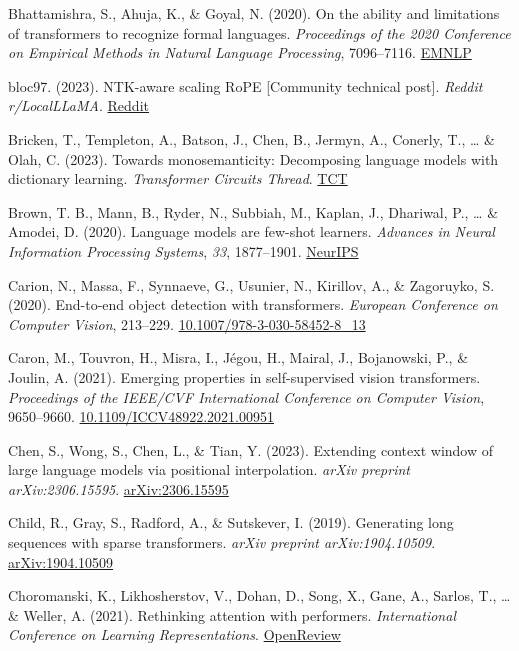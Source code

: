 \documentclass[10pt,twocolumn]{article}
\begin{document}
Bhattamishra, S., Ahuja, K., \& Goyal, N. (2020). On the ability and limitations of transformers to recognize formal languages. \emph{Proceedings of the 2020 Conference on Empirical Methods in Natural Language Processing}, 7096--7116. \href{https://aclanthology.org/2020.emnlp-main.576}{EMNLP}

bloc97. (2023). NTK-aware scaling RoPE [Community technical post]. \emph{Reddit r/LocalLLaMA}. \href{https://www.reddit.com/r/LocalLLaMA/comments/14lz7j5/ntkaware_scaled_rope_allows_llama_models_to_have/}{Reddit}

Bricken, T., Templeton, A., Batson, J., Chen, B., Jermyn, A., Conerly, T., \ldots{} \& Olah, C. (2023). Towards monosemanticity: Decomposing language models with dictionary learning. \emph{Transformer Circuits Thread}. \href{https://transformer-circuits.pub/2023/monosemantic-features/index.html}{TCT}

Brown, T. B., Mann, B., Ryder, N., Subbiah, M., Kaplan, J., Dhariwal, P., \ldots{} \& Amodei, D. (2020). Language models are few-shot learners. \emph{Advances in Neural Information Processing Systems}, \emph{33}, 1877--1901. \href{https://papers.nips.cc/paper/2020/hash/1457c0d6bfcb4967418bfb8ac142f64a-Abstract.html}{NeurIPS}

Carion, N., Massa, F., Synnaeve, G., Usunier, N., Kirillov, A., \& Zagoruyko, S. (2020). End-to-end object detection with transformers. \emph{European Conference on Computer Vision}, 213--229. \href{https://doi.org/10.1007/978-3-030-58452-8_13}{10.1007/978-3-030-58452-8\_13}

Caron, M., Touvron, H., Misra, I., Jégou, H., Mairal, J., Bojanowski, P., \& Joulin, A. (2021). Emerging properties in self-supervised vision transformers. \emph{Proceedings of the IEEE/CVF International Conference on Computer Vision}, 9650--9660. \href{https://doi.org/10.1109/ICCV48922.2021.00951}{10.1109/ICCV48922.2021.00951}

Chen, S., Wong, S., Chen, L., \& Tian, Y. (2023). Extending context window of large language models via positional interpolation. \emph{arXiv preprint arXiv:2306.15595}. \href{https://arxiv.org/abs/2306.15595}{arXiv:2306.15595}

Child, R., Gray, S., Radford, A., \& Sutskever, I. (2019). Generating long sequences with sparse transformers. \emph{arXiv preprint arXiv:1904.10509}. \href{https://arxiv.org/abs/1904.10509}{arXiv:1904.10509}

Choromanski, K., Likhosherstov, V., Dohan, D., Song, X., Gane, A., Sarlos, T., \ldots{} \& Weller, A. (2021). Rethinking attention with performers. \emph{International Conference on Learning Representations}. \href{https://openreview.net/forum?id=Ua6zuk0WRH}{OpenReview}
\end{document}
